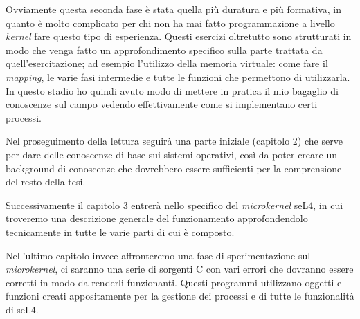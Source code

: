 Ovviamente questa seconda fase è stata quella più duratura e più formativa, in quanto è molto complicato per chi non ha mai fatto programmazione a livello \textit{kernel} fare questo tipo di esperienza. Questi esercizi oltretutto sono strutturati in modo che venga fatto un approfondimento specifico sulla parte trattata da quell'esercitazione; ad esempio l'utilizzo della memoria virtuale: come fare il \textit{mapping}, le varie fasi intermedie e tutte le funzioni che permettono di utilizzarla. In questo stadio ho quindi avuto modo di mettere in pratica il mio bagaglio di conoscenze sul campo vedendo effettivamente come si implementano certi processi.
\newline

Nel proseguimento della lettura seguirà una parte iniziale (capitolo 2) che serve per dare delle conoscenze di base sui sistemi operativi, così da poter creare un background di conoscenze che dovrebbero essere sufficienti per la comprensione del resto della tesi. 

Successivamente il capitolo 3 entrerà nello specifico del \textit{microkernel} seL4, in cui troveremo una descrizione generale del funzionamento approfondendolo tecnicamente in tutte le varie parti di cui è composto.

Nell'ultimo capitolo invece affronteremo una fase di sperimentazione sul \textit{microkernel}, ci saranno una serie di sorgenti C con vari errori che dovranno essere corretti in modo da renderli funzionanti. Questi programmi utilizzano oggetti e funzioni creati appositamente per la gestione dei processi e di tutte le funzionalità di seL4. 
